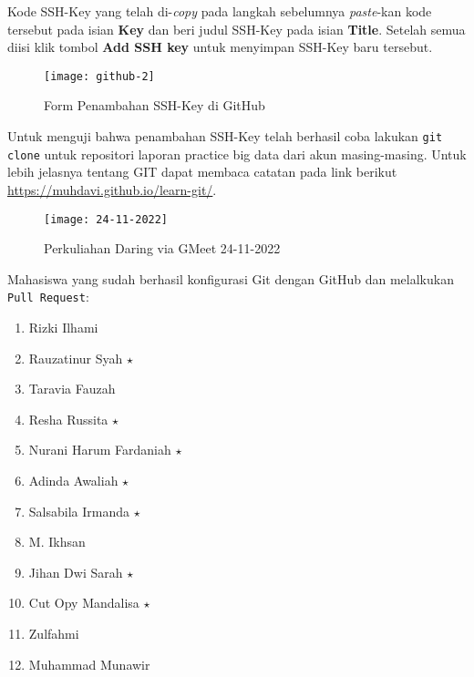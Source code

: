 \documentclass[a4paper]{tufte-handout}
\begin{document}
\begin{enumerate}
Kode SSH-Key yang telah di-\textit{copy} pada langkah sebelumnya \textit{paste}-kan kode tersebut pada isian \textbf{Key} dan beri judul SSH-Key pada isian \textbf{Title}. Setelah semua diisi klik tombol \textbf{Add SSH key} untuk menyimpan SSH-Key baru tersebut.

\begin{figure}[!ht]
\texttt{[image: github-2]}
\caption{Form Penambahan SSH-Key di GitHub}
\label{gam:form-ssh}
\end{figure}

Untuk menguji bahwa penambahan SSH-Key telah berhasil coba lakukan {\tt git clone} untuk repositori laporan practice big data dari akun masing-masing. Untuk lebih jelasnya tentang GIT dapat membaca catatan pada link berikut \url{https://muhdavi.github.io/learn-git/}.
\end{enumerate}

\begin{figure}[!ht]
\texttt{[image: 24-11-2022]}
\caption{Perkuliahan Daring via GMeet 24-11-2022}
\label{gam:form-ssh}
\end{figure}

\clearpage
{}


Mahasiswa yang sudah berhasil konfigurasi Git dengan GitHub dan melalkukan {\tt Pull Request}:
\begin{multicols}{2}
\begin{enumerate}
\item Rizki Ilhami
\item Rauzatinur Syah $\star$
\item Taravia Fauzah
\item Resha Russita $\star$
\item Nurani Harum Fardaniah $\star$
\item Adinda Awaliah $\star$
\item Salsabila Irmanda $\star$
\item M. Ikhsan
\item Jihan Dwi Sarah $\star$
\item Cut Opy Mandalisa $\star$
\item Zulfahmi
\item Muhammad Munawir
\end{enumerate}
\end{multicols}
\end{document}
